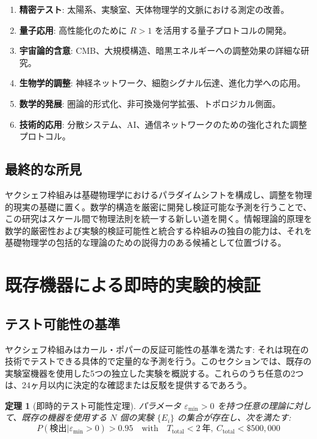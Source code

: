 \documentclass[11pt,a4paper]{article}
\newtheorem{theorem}{定理}
\begin{document}
	\begin{enumerate}
		\item \textbf{精密テスト}: 太陽系、実験室、天体物理学的文脈における測定の改善。
		
		\item \textbf{量子応用}: 高性能化のために $R>1$ を活用する量子プロトコルの開発。
		
		\item \textbf{宇宙論的含意}: CMB、大規模構造、暗黒エネルギーへの調整効果の詳細な研究。
		
		\item \textbf{生物学的調整}: 神経ネットワーク、細胞シグナル伝達、進化力学への応用。
		
		\item \textbf{数学的発展}: 圏論的形式化、非可換幾何学拡張、トポロジカル側面。
		
		\item \textbf{技術的応用}: 分散システム、AI、通信ネットワークのための強化された調整プロトコル。
	\end{enumerate}
	
	\subsection{最終的な所見}
	
	ヤクシェフ枠組みは基礎物理学におけるパラダイムシフトを構成し、調整を物理的現実の基礎に置く。数学的構造を厳密に開発し検証可能な予測を行うことで、この研究はスケール間で物理法則を統一する新しい道を開く。情報理論的原理を数学的厳密性および実験的検証可能性と統合する枠組みの独自の能力は、それを基礎物理学の包括的な理論のための説得力のある候補として位置づける。
	
	\section{既存機器による即時的実験的検証}
	\label{sec:immediate-verification}
	
	\subsection{テスト可能性の基準}
	
	ヤクシェフ枠組みはカール・ポパーの反証可能性の基準を満たす: それは現在の技術でテストできる具体的で定量的な予測を行う。このセクションでは、既存の実験室機器を使用した5つの独立した実験を概説する。これらのうち任意の2つは、24ヶ月以内に決定的な確認または反駁を提供するであろう。
	
	\begin{theorem}[即時的テスト可能性定理]
		パラメータ $\varepsilon_{\min} > 0$ を持つ任意の理論に対して、既存の機器を使用する $N$ 個の実験 $\{E_i\}$ の集合が存在し、次を満たす:
		\begin{equation}
			\boxed{P(\text{検出}|\varepsilon_{\min} > 0) > 0.95 \quad \text{with} \quad T_{\text{total}} < 2\ \text{年}, \ C_{\text{total}} < \$500,000}
		\end{equation}
	\end{theorem}
	
\end{document}
